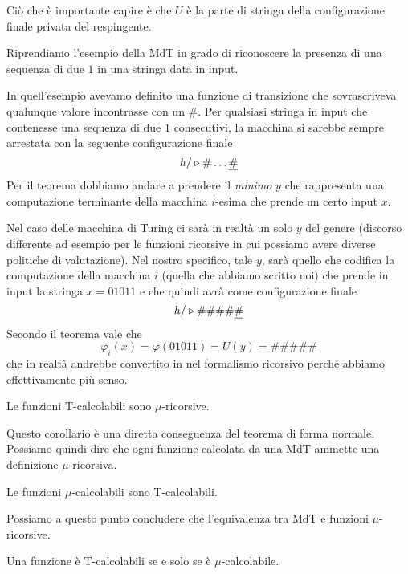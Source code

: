 Ciò che è importante capire è che $U$ è la parte di stringa
della configurazione finale privata del respingente.

\begin{example}
	Riprendiamo l'esempio della MdT in grado di riconoscere la
	presenza di una sequenza di due $1$ in una stringa data in
	input.

	In quell'esempio avevamo definito una funzione di
	transizione che sovrascriveva qualunque valore incontrasse
	con un $\#$. Per qualsiasi stringa in input che contenesse
	una sequenza di due $1$ consecutivi, la macchina si sarebbe
	sempre arrestata con la seguente configurazione finale
	\[ h / \triangleright \# \dots \underline{\#} \]
	Per il teorema dobbiamo andare a prendere il \emph{minimo}
	$y$ che rappresenta una computazione terminante della
	macchina $i$-esima che prende un certo input $x$.

	Nel caso delle macchina di Turing ci sarà in realtà un solo
	$y$ del genere (discorso differente ad esempio per le
	funzioni ricorsive in cui possiamo avere diverse politiche
	di valutazione). Nel nostro specifico, tale $y$, sarà quello
	che codifica la computazione della macchina $i$ (quella che
	abbiamo scritto noi) che prende in input la stringa
	$x = 01011$ e che quindi avrà come configurazione finale
	\[ h / \triangleright \# \# \# \# \underline{\#} \]
	Secondo il teorema vale che
	\[ \varphi_i (x) = \varphi (01011) = U(y) = \# \# \# \# \# \]
	che in realtà andrebbe convertito in nel formalismo
	ricorsivo perché abbiamo effettivamente più senso.
\end{example}

\begin{corollary}
	Le funzioni T-calcolabili sono $\mu$-ricorsive.
\end{corollary}

Questo corollario è una diretta conseguenza del teorema di
forma normale. Possiamo quindi dire che ogni funzione calcolata
da una MdT ammette una definizione $\mu$-ricorsiva.

\begin{lemma}
	Le funzioni $\mu$-calcolabili sono T-calcolabili.
\end{lemma}

Possiamo a questo punto concludere che l'equivalenza tra MdT
e funzioni $\mu$-ricorsive.

\begin{theorem}
	Una funzione è T-calcolabili se e solo se è
	$\mu$-calcolabile.
\end{theorem}

